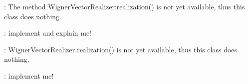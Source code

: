 \begin{DoxyRefList}
\item[\label{todo__todo000055}%
\hypertarget{todo__todo000055}{}%
Class \hyperlink{class_q_u_e_s_o_1_1_wigner_vector_realizer}{Q\-U\-E\-S\-O\-:\-:Wigner\-Vector\-Realizer$<$ V, M $>$} ]\-: The method Wigner\-Vector\-Realizer\-:realization() is not yet available, thus this class does nothing.  
\item[\label{todo__todo000056}%
\hypertarget{todo__todo000056}{}%
Member \hyperlink{class_q_u_e_s_o_1_1_wigner_vector_realizer_a0d72232eb5843e78fc3d02a510ceb966}{Q\-U\-E\-S\-O\-:\-:Wigner\-Vector\-Realizer$<$ V, M $>$\-:\-:realization} (V \&next\-Values) const ]\-: implement and explain me!  
\item[\label{todo__todo000057}%
\hypertarget{todo__todo000057}{}%
Class \hyperlink{class_q_u_e_s_o_1_1_wigner_vector_r_v}{Q\-U\-E\-S\-O\-:\-:Wigner\-Vector\-R\-V$<$ V, M $>$} ]\-: Wigner\-Vector\-Realizer.\-realization() is not yet available, thus this class does nothing.  
\item[\label{todo__todo000058}%
\hypertarget{todo__todo000058}{}%
Member \hyperlink{class_q_u_e_s_o_1_1_wigner_vector_r_v_a6658542aa6a551c1b92de93558cb67fa}{Q\-U\-E\-S\-O\-:\-:Wigner\-Vector\-R\-V$<$ V, M $>$\-:\-:print} (std\-::ostream \&os) const ]\-: implement me! 
\end{DoxyRefList}